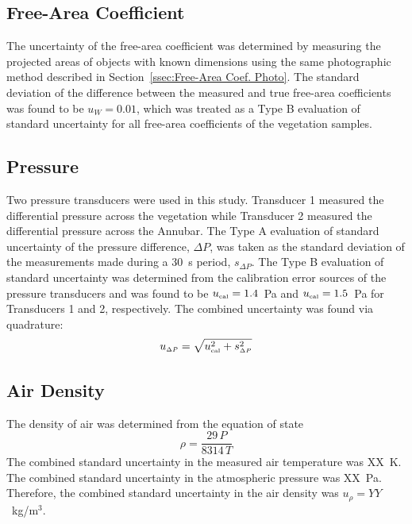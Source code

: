 \documentclass[12pt]{article}
\begin{document}
\subsection{ Free-Area Coefficient }
\label{ssec:FAACUncertainty}

The uncertainty of the free-area coefficient was determined by measuring the projected areas of objects with known dimensions using the same photographic method described in Section~\ref{ssec:Free-Area Coef. Photo}. The standard deviation of the difference between the measured and true free-area coefficients was found to be $u_{\scriptscriptstyle W}=0.01$, which was treated as a Type B evaluation of standard uncertainty for all free-area coefficients of the vegetation samples.


\subsection{Pressure}
\label{ssec:PressUncertainty}

Two pressure transducers were used in this study. Transducer 1 measured the differential pressure across the vegetation while Transducer 2 measured the differential pressure across the Annubar. The Type A evaluation of standard uncertainty of the pressure difference, $\Delta P$, was taken as the standard deviation of the measurements made during a 30~s period, $s_{\scriptscriptstyle \Delta P}$. The Type B evaluation of standard uncertainty was determined from the calibration error sources of the pressure transducers and was found to be $u_{\rm \scriptscriptstyle cal}=1.4$~Pa and $u_{\rm \scriptscriptstyle cal}=1.5$~Pa for Transducers 1 and 2, respectively. The combined uncertainty was found via quadrature:
\begin{equation}
\label{eq:pressureuncertainty}
u_{\scriptscriptstyle \Delta P} = \sqrt{ u_{\rm \scriptscriptstyle cal}^2 + s_{\scriptscriptstyle \Delta P}^2}
\end{equation}


\subsection{Air Density}
\label{ssec:ADUncertainty}

The density of air was determined from the equation of state
\begin{equation}
   \rho = \frac{ 29 \, P }{8314 \, T}
\end{equation}
The combined standard uncertainty in the measured air temperature was XX~K. The combined standard uncertainty in the atmospheric pressure was XX~Pa. Therefore, the combined standard uncertainty in the air density was $u_{\scriptscriptstyle \rho}=YY$~kg/m$^3$.
\end{document}
